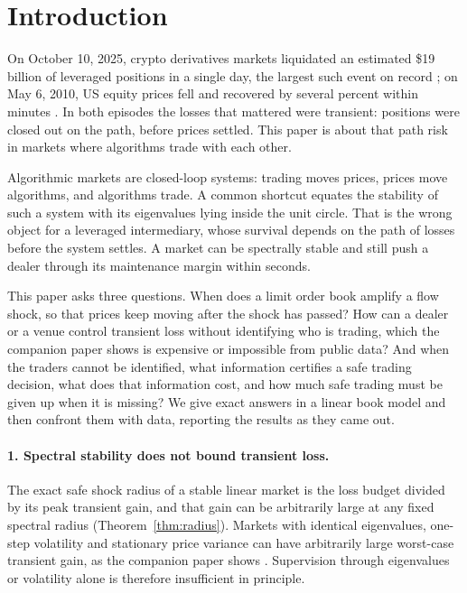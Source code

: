 \documentclass[12pt]{article}
\theoremstyle{definition}
\theoremstyle{remark}
\begin{document}
\section{Introduction}

On October 10, 2025, crypto derivatives markets liquidated an estimated \$19 billion of leveraged positions in a single day, the largest such event on record \citep{shares2025}; on May 6, 2010, US equity prices fell and recovered by several percent within minutes \citep{kirilenko2017}. In both episodes the losses that mattered were transient: positions were closed out on the path, before prices settled. This paper is about that path risk in markets where algorithms trade with each other.

Algorithmic markets are closed-loop systems: trading moves prices, prices move algorithms, and algorithms trade. A common shortcut equates the stability of such a system with its eigenvalues lying inside the unit circle. That is the wrong object for a leveraged intermediary, whose survival depends on the path of losses before the system settles. A market can be spectrally stable and still push a dealer through its maintenance margin within seconds.

This paper asks three questions. When does a limit order book amplify a flow shock, so that prices keep moving after the shock has passed? How can a dealer or a venue control transient loss without identifying who is trading, which the companion paper \citep{niroula2026} shows is expensive or impossible from public data? And when the traders cannot be identified, what information certifies a safe trading decision, what does that information cost, and how much safe trading must be given up when it is missing? We give exact answers in a linear book model and then confront them with data, reporting the results as they came out.

\paragraph{1. Spectral stability does not bound transient loss.} The exact safe shock radius of a stable linear market is the loss budget divided by its peak transient gain, and that gain can be arbitrarily large at any fixed spectral radius (Theorem~\ref{thm:radius}). Markets with identical eigenvalues, one-step volatility and stationary price variance can have arbitrarily large worst-case transient gain, as the companion paper shows \citep{niroula2026}. Supervision through eigenvalues or volatility alone is therefore insufficient in principle.
\end{document}
